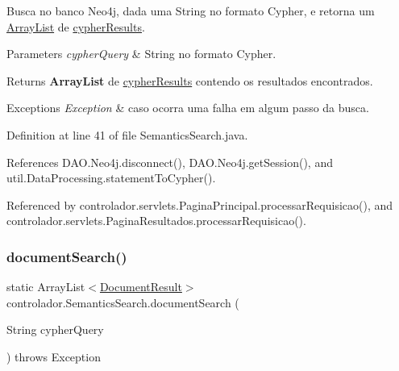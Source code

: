 Busca no banco Neo4j, dada uma String no formato Cypher, e retorna um \hyperlink{}{Array\+List} de \hyperlink{}{cypher\+Results}.


\begin{DoxyParams}{Parameters}
{\em cypher\+Query} & String no formato Cypher. \\
\hline
\end{DoxyParams}
\begin{DoxyReturn}{Returns}
{\bfseries Array\+List} de \hyperlink{}{cypher\+Results} contendo os resultados encontrados. 
\end{DoxyReturn}

\begin{DoxyExceptions}{Exceptions}
{\em Exception} & caso ocorra uma falha em algum passo da busca. \\
\hline
\end{DoxyExceptions}


Definition at line 41 of file Semantics\+Search.\+java.



References D\+A\+O.\+Neo4j.\+disconnect(), D\+A\+O.\+Neo4j.\+get\+Session(), and util.\+Data\+Processing.\+statement\+To\+Cypher().



Referenced by controlador.\+servlets.\+Pagina\+Principal.\+processar\+Requisicao(), and controlador.\+servlets.\+Pagina\+Resultados.\+processar\+Requisicao().

\hypertarget{classcontrolador_1_1SemanticsSearch_a0cd2e6b6e45fe9738ea91c606a48afef}{}\label{classcontrolador_1_1SemanticsSearch_a0cd2e6b6e45fe9738ea91c606a48afef} 
\subsubsection{\texorpdfstring{document\+Search()}{documentSearch()}}
{\footnotesize\ttfamily static Array\+List$<$\hyperlink{classentidade_1_1resultados_1_1DocumentResult}{Document\+Result}$>$ controlador.\+Semantics\+Search.\+document\+Search (\begin{DoxyParamCaption}\item[{String}]{cypher\+Query }\end{DoxyParamCaption}) throws Exception\hspace{0.3cm}{\ttfamily [static]}}

